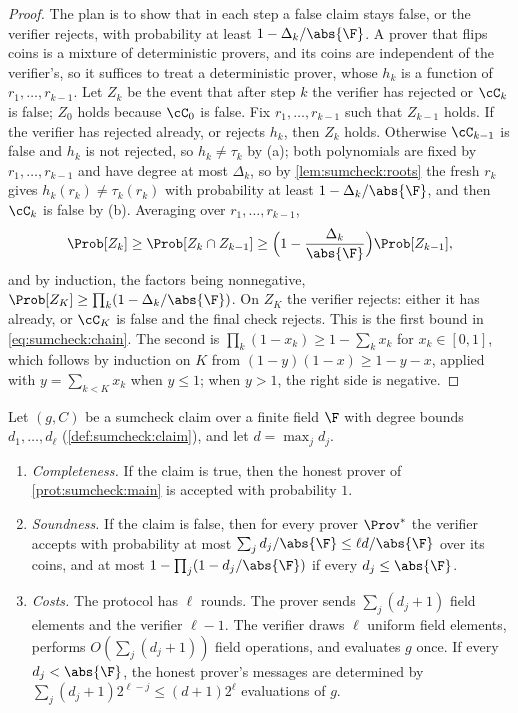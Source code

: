 \begin{refsection}
\begin{proof}
The plan is to show that in each step a false claim stays false, or the verifier rejects, with probability at least $1-\Delta_k/\abs{\F}$. A prover that flips coins is a mixture of deterministic provers, and its coins are independent of the verifier's, so it suffices to treat a deterministic prover, whose $h_k$ is a function of $r_1,\dots,r_{k-1}$. Let $Z_k$ be the event that after step $k$ the verifier has rejected or $\cC_k$ is false; $Z_0$ holds because $\cC_0$ is false. Fix $r_1,\dots,r_{k-1}$ such that $Z_{k-1}$ holds. If the verifier has rejected already, or rejects $h_k$, then $Z_k$ holds. Otherwise $\cC_{k-1}$ is false and $h_k$ is not rejected, so $h_k\ne\tau_k$ by (a); both polynomials are fixed by $r_1,\dots,r_{k-1}$ and have degree at most $\Delta_k$, so by \cref{lem:sumcheck:roots} the fresh $r_k$ gives $h_k(r_k)\ne\tau_k(r_k)$ with probability at least $1-\Delta_k/\abs{\F}$, and then $\cC_k$ is false by (b). Averaging over $r_1,\dots,r_{k-1}$,
\[\Prob[Z_k]\ge\Prob[Z_k\cap Z_{k-1}]\ge\Bigl(1-\frac{\Delta_k}{\abs{\F}}\Bigr)\Prob[Z_{k-1}],\]
and by induction, the factors being nonnegative, $\Prob[Z_K]\ge\prod_k(1-\Delta_k/\abs{\F})$. On $Z_K$ the verifier rejects: either it has already, or $\cC_K$ is false and the final check rejects. This is the first bound in \eqref{eq:sumcheck:chain}. The second is $\prod_k(1-x_k)\ge1-\sum_kx_k$ for $x_k\in[0,1]$, which follows by induction on $K$ from $(1-y)(1-x)\ge1-y-x$, applied with $y=\sum_{k<K}x_k$ when $y\le1$; when $y>1$, the right side is negative.
\end{proof}

\begin{theorem}\label{thm:sumcheck:sumcheck}
Let $(g,C)$ be a sumcheck claim over a finite field $\F$ with degree bounds $d_1,\dots,d_\ell$ (\cref{def:sumcheck:claim}), and let $d=\max_jd_j$.
\begin{enumerate}
\item \emph{Completeness.} If the claim is true, then the honest prover of \cref{prot:sumcheck:main} is accepted with probability $1$.
\item \emph{Soundness.} If the claim is false, then for every prover $\Prov^*$ the verifier accepts with probability at most $\sum_jd_j/\abs{\F}\le\ell d/\abs{\F}$ over its coins, and at most $1-\prod_j(1-d_j/\abs{\F})$ if every $d_j\le\abs{\F}$.
\item \emph{Costs.} The protocol has $\ell$ rounds. The prover sends $\sum_j(d_j+1)$ field elements and the verifier $\ell-1$. The verifier draws $\ell$ uniform field elements, performs $O(\sum_j(d_j+1))$ field operations, and evaluates $g$ once. If every $d_j<\abs{\F}$, the honest prover's messages are determined by $\sum_j(d_j+1)2^{\ell-j}\le(d+1)2^\ell$ evaluations of $g$.
\end{enumerate}
\end{theorem}


\end{refsection}

